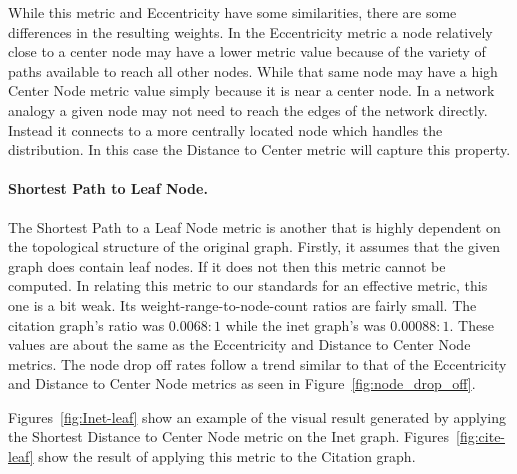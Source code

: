 While this metric and Eccentricity have some similarities, there are some differences in the resulting weights.  In the Eccentricity metric a node relatively close to a center node may have a lower metric value because of the variety of paths available to reach all other nodes.  While that same node may have a high Center Node metric value simply because it is near a center node.  In a network analogy a given node may not need to reach the edges of the network directly.  Instead it connects to a more centrally located node which handles the distribution.  In this case the Distance to Center metric will capture this property.

\paragraph*{Shortest Path to Leaf Node.}
The Shortest Path to a Leaf Node metric is another that is highly dependent on the topological structure of the original graph.  Firstly, it assumes that the given graph does contain leaf nodes.  If it does not then this metric cannot be computed.  In relating this metric to our standards for an effective metric, this one is a bit weak.  Its weight-range-to-node-count ratios are fairly small.  The citation graph's ratio was $0.0068:1$ while the inet graph's was $0.00088:1$.  These values are about the same as the Eccentricity and Distance to Center Node metrics.  The node drop off rates follow a trend similar to that of the Eccentricity and Distance to Center Node metrics as seen in Figure~\ref{fig:node_drop_off}.

Figures~\ref{fig:Inet-leaf} show an example of the visual result generated by applying the Shortest Distance to Center Node metric on the Inet graph.  Figures~\ref{fig:cite-leaf} show the result of applying this metric to the Citation graph.

